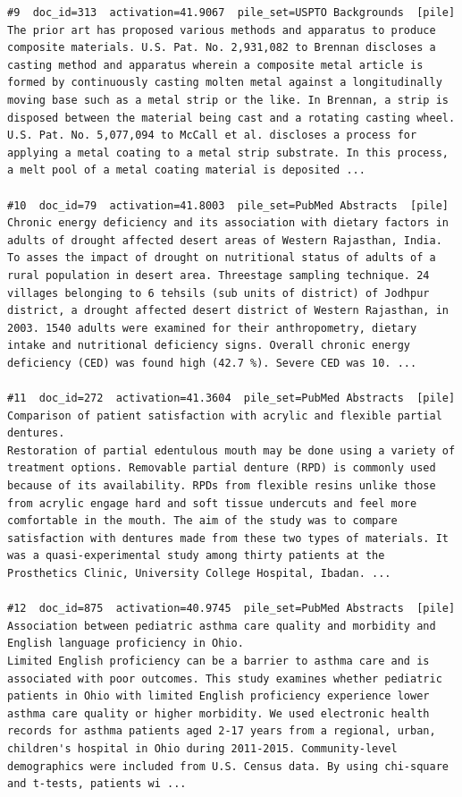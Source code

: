 \begin{verbatim}
#9  doc_id=313  activation=41.9067  pile_set=USPTO Backgrounds  [pile]
The prior art has proposed various methods and apparatus to produce composite materials. U.S. Pat. No. 2,931,082 to Brennan discloses a casting method and apparatus wherein a composite metal article is formed by continuously casting molten metal against a longitudinally moving base such as a metal strip or the like. In Brennan, a strip is disposed between the material being cast and a rotating casting wheel.
U.S. Pat. No. 5,077,094 to McCall et al. discloses a process for applying a metal coating to a metal strip substrate. In this process, a melt pool of a metal coating material is deposited ...

#10  doc_id=79  activation=41.8003  pile_set=PubMed Abstracts  [pile]
Chronic energy deficiency and its association with dietary factors in adults of drought affected desert areas of Western Rajasthan, India.
To asses the impact of drought on nutritional status of adults of a rural population in desert area. Threestage sampling technique. 24 villages belonging to 6 tehsils (sub units of district) of Jodhpur district, a drought affected desert district of Western Rajasthan, in 2003. 1540 adults were examined for their anthropometry, dietary intake and nutritional deficiency signs. Overall chronic energy deficiency (CED) was found high (42.7 %). Severe CED was 10. ...

#11  doc_id=272  activation=41.3604  pile_set=PubMed Abstracts  [pile]
Comparison of patient satisfaction with acrylic and flexible partial dentures.
Restoration of partial edentulous mouth may be done using a variety of treatment options. Removable partial denture (RPD) is commonly used because of its availability. RPDs from flexible resins unlike those from acrylic engage hard and soft tissue undercuts and feel more comfortable in the mouth. The aim of the study was to compare satisfaction with dentures made from these two types of materials. It was a quasi-experimental study among thirty patients at the Prosthetics Clinic, University College Hospital, Ibadan. ...

#12  doc_id=875  activation=40.9745  pile_set=PubMed Abstracts  [pile]
Association between pediatric asthma care quality and morbidity and English language proficiency in Ohio.
Limited English proficiency can be a barrier to asthma care and is associated with poor outcomes. This study examines whether pediatric patients in Ohio with limited English proficiency experience lower asthma care quality or higher morbidity. We used electronic health records for asthma patients aged 2-17 years from a regional, urban, children's hospital in Ohio during 2011-2015. Community-level demographics were included from U.S. Census data. By using chi-square and t-tests, patients wi ...


\end{verbatim}
